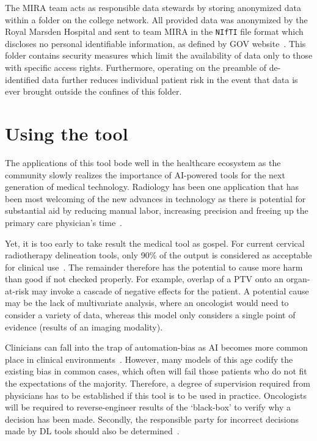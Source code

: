 \documentclass[11pt,twoside]{report}
\begin{document}
The MIRA team acts as responsible data stewards by storing anonymized data within a folder on the college network. All provided data was anonymized by the Royal Marsden Hospital and sent to team MIRA in the \texttt{NIfTI} file format which discloses no personal identifiable information, as defined by GOV website~\cite{gov-gdpr}. This folder contains security measures which limit the availability of data only to those with specific access rights. Furthermore, operating on the preamble of de-identified data further reduces individual patient risk in the event that data is ever brought outside the confines of this folder.

\section{Using the tool}\label{sect:using-the-tool}

The applications of this tool bode well in the healthcare ecosystem as the community slowly realizes the importance of AI-powered tools for the next generation of medical technology. Radiology has been one application that has been most welcoming of the new advances in technology as there is potential for substantial aid by reducing manual labor, increasing precision and freeing up the primary care physician's time~\cite{overview-of-ai-medicine}.

Yet, it is too early to take result the medical tool as gospel. For current cervical radiotherapy delineation tools, only 90\% of the output is considered as acceptable for clinical use~\cite{auto-delineation-cervical-cancer-development}. The remainder therefore has the potential to cause more harm than good if not checked properly. For example, overlap of a PTV onto an organ-at-risk may invoke a cascade of negative effects for the patient. A potential cause may be the lack of multivariate analysis, where an oncologist would need to consider a variety of data, whereas this model only considers a single point of evidence (results of an imaging modality).

Clinicians can fall into the trap of automation-bias as AI becomes more common place in clinical environments~\cite{automation-bias}. However, many models of this age codify the existing bias in common cases, which often will fail those patients who do not fit the expectations of the majority. Therefore, a degree of supervision required from physicians has to be established if this tool is to be used in practice. Oncologists will be required to reverse-engineer results of the `black-box' to verify why a decision has been made. Secondly, the responsible party for incorrect decisions made by DL tools should also be determined~\cite{AI-in-cancer-diagnosis-era}.

\printbibliography
{}
\end{document}
